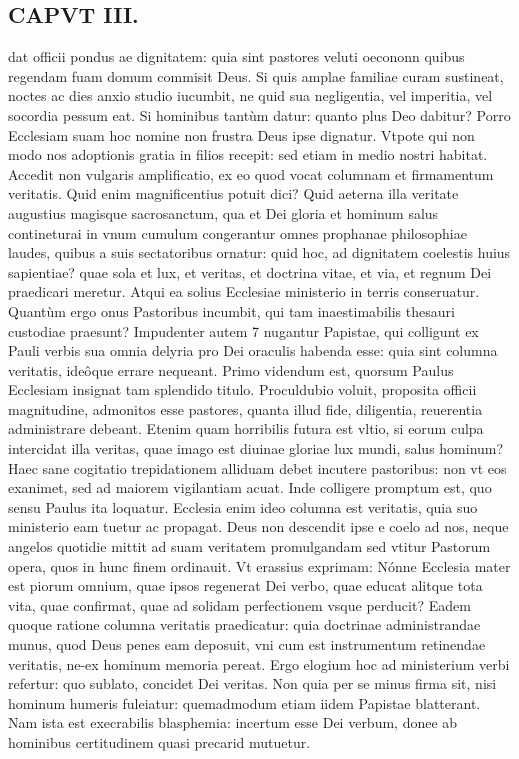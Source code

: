 \documentclass{article}
\begin{document}
\begin{pages}
\section*{CAPVT III. }
\marginpar{[ p.39 ]}\pstart dat officii pondus ae dignitatem: quia sint pastores veluti oecononn quibus regendam fuam domum commisit Deus. Si quis amplae familiae curam sustineat, noctes ac dies anxio studio iucumbit, ne quid sua negligentia, vel imperitia, vel socordia pessum eat. Si hominibus tantùm datur: quanto plus Deo dabitur? Porro Ecclesiam suam hoc nomine non frustra Deus ipse dignatur. Vtpote qui non modo nos adoptionis gratia in filios recepit: sed etiam in medio nostri habitat. Accedit non vulgaris amplificatio, ex eo quod vocat columnam et firmamentum veritatis. Quid enim magnificentius potuit dici? Quid aeterna illa veritate augustius magisque sacrosanctum, qua et Dei gloria et hominum salus contineturai in vnum cumulum congerantur omnes prophanae philosophiae laudes, quibus a suis sectatoribus ornatur: quid hoc, ad dignitatem coelestis huius sapientiae? quae sola et lux, et veritas, et doctrina vitae, et via, et regnum Dei praedicari meretur. Atqui ea solius Ecclesiae ministerio in terris conseruatur. Quantùm ergo onus Pastoribus incumbit, qui tam inaestimabilis thesauri custodiae praesunt? Impudenter autem 7 nugantur Papistae, qui colligunt ex Pauli verbis sua omnia delyria pro Dei oraculis habenda esse: quia sint columna veritatis, ideôque errare nequeant. Primo videndum est, quorsum Paulus Ecclesiam insignat tam splendido titulo. Proculdubio voluit, proposita officii magnitudine, admonitos esse pastores, quanta illud fide, diligentia, reuerentia administrare debeant. Etenim quam horribilis futura est vltio, si eorum culpa intercidat illa veritas, quae imago est diuinae gloriae lux mundi, salus hominum? Haec sane cogitatio trepidationem alliduam debet incutere pastoribus: non vt eos exanimet, sed ad maiorem vigilantiam acuat. Inde colligere promptum est, quo sensu Paulus ita loquatur. Ecclesia enim ideo columna est veritatis, quia suo ministerio eam tuetur ac propagat. Deus non descendit ipse e coelo ad nos, neque angelos quotidie mittit ad suam veritatem promulgandam sed vtitur Pastorum opera, quos in hunc finem ordinauit. Vt erassius exprimam: Nónne Ecclesia mater est piorum omnium, quae ipsos regenerat Dei verbo, quae educat alitque tota vita, quae confirmat, quae ad solidam perfectionem vsque perducit? Eadem quoque ratione columna veritatis praedicatur: quia doctrinae administrandae munus, quod Deus penes eam deposuit, vni cum est instrumentum retinendae veritatis, ne-ex hominum memoria pereat. Ergo elogium hoc ad ministerium verbi refertur: quo sublato, concidet Dei veritas. Non quia per se minus firma sit, nisi hominum humeris fuleiatur: quemadmodum etiam iidem Papistae blatterant. Nam ista est execrabilis blasphemia: incertum esse Dei verbum, donee ab hominibus certitudinem quasi precarid mutuetur.  \pend

\end{pages}
\end{document}
